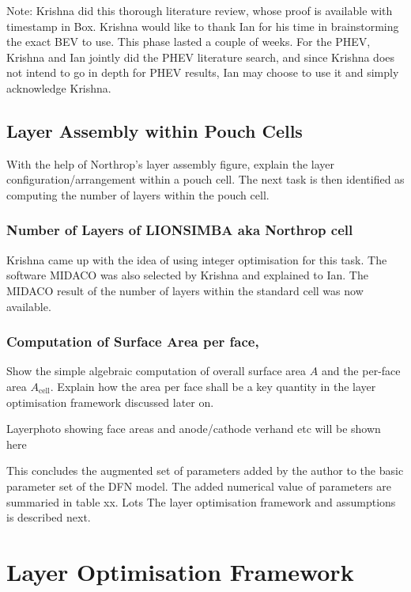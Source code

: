 Note: Krishna did this thorough literature review, whose proof is available with
timestamp in Box. Krishna would like to  thank Ian for his time in brainstorming
the exact BEV to use. This phase lasted a couple of weeks. For the PHEV, Krishna
and  Ian jointly  did the  PHEV literature  search, and  since Krishna  does not
intend to  go in depth  for PHEV results,  Ian may choose  to use it  and simply
acknowledge Krishna.

\subsection{Layer Assembly within Pouch Cells}
With  the  help   of  Northrop's  layer  assembly  figure,   explain  the  layer
configuration/arrangement within a pouch cell.  The next task is then identified
as computing the number of layers within the pouch cell.

\subsubsection*{Number of Layers of LIONSIMBA aka Northrop cell}
Krishna came up with  the idea of using integer optimisation  for this task. The
software MIDACO  was also selected by  Krishna and explained to  Ian. The MIDACO
result of the number of layers within the standard cell was now available.

\subsubsection*{Computation of Surface Area per face,~}
Show  the simple  algebraic  computation of  overall surface  area  $A$ and  the
per-face area  $A_\text{cell}$. Explain  how the  area per face  shall be  a key
quantity in the layer optimisation framework discussed later on.

Layerphoto showing face areas and anode/cathode verhand etc will be shown here

This concludes the augmented set of parameters  added by the author to the basic
parameter set  of the  DFN model.  The added numerical  value of  parameters are
summaried in table xx. Lots The  layer optimisation framework and assumptions is
described next. %

\section{Layer Optimisation Framework}

